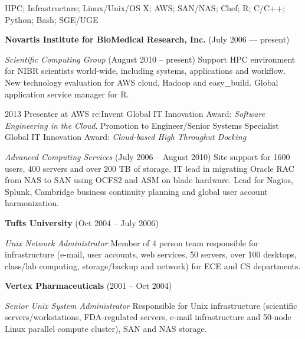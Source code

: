 \documentclass[11pt,article,oneside]{memoir}
\begin{document}
\medskip

\reversemarginpar

\bigskip


\ind HPC; Infrastructure; Linux/Unix/OS X; AWS; SAN/NAS; Chef; R; C/C++; Python; Bash; SGE/UGE

\bigskip

{}

\ind \textbf{Novartis Institute for BioMedical Research, Inc.} (July 2006 --- present)

\noindent\textit{Scientific Computing Group} (August 2010 -- present)
Support HPC environment for NIBR scientists world-wide, including
systems, applications and workflow. New technology evaluation for AWS
cloud, Hadoop and easy\_build. Global application service manager for R.

\ind \hspace{0.35in} \footnotesize 2013 Presenter at AWS
re:Invent Global IT Innovation Award:
\textit{Software Engineering in the Cloud}. Promotion to
Engineer/Senior Systems Specialist Global IT
Innovation Award: \textit{Cloud-based High Throughut Docking}
\normalsize \vspace{0.05in}

\noindent\textit{Advanced Computing Services} (July 2006 -- August
2010) Site support for 1600 users, 400 servers and over 200 TB of
storage. IT lead in migrating Oracle RAC from NAS to SAN using OCFS2
and ASM on blade hardware. Lead for Nagios, Splunk, Cambridge business
continuity planning and global user account harmonization.

\ind\textbf{Tufts University} (Oct 2004 -- July 2006)

\noindent\textit{Unix Network Administrator} Member of 4 person team
responsible for infrastructure (e-mail, user accounts, web services,
50 servers, over 100 desktops, class/lab computing, storage/backup and
network) for ECE and CS departments.

\ind \textbf{Vertex Pharmaceuticals} (2001 -- Oct 2004)

\noindent\textit{Senior Unix System Administrator} Responsible for
Unix infrastructure (scientific servers/workstations, FDA-regulated
servers, e-mail infrastructure and 50-node Linux parallel compute
cluster), SAN and NAS storage.
\end{document}
